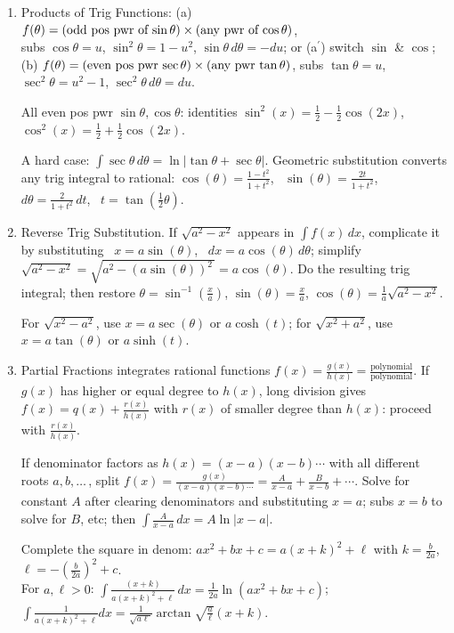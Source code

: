 \documentclass[10pt]{article}
\begin{document}
\begin{enumerate}
After identities, the right side may again contain $-\int f(x)\,dx$: 
solve for the integral.

\item Products of Trig Functions: (a) 
$f(\theta)= 
(\text{odd pos pwr of\,}\sin\theta)\times(\text{any pwr of\,}\cos\theta)$, \\
subs $\cos\theta=u$, $\sin^2\!\theta=1-u^2$, $\sin\theta\,d\theta=-du$; 
or (a$^\prime$) switch $\sin$ \& $\cos$; 
(b) $f(\theta)=(\text{even pos pwr\,}\sec\theta)\times(\text{any pwr\,}\tan\theta)$, 
subs $\tan\theta=u$, 
$\sec^2\!\theta=u^2-1$, $\sec^2\!\theta\,d\theta=du$.

All even pos pwr $\sin\theta, \cos\theta$:  identities 
$\sin^2(x)=\frac12-\frac12\cos(2x)$, 
$\cos^2(x)=\frac12+\frac12\cos(2x)$.

A hard case: $\int \sec\theta\,d\theta = \ln\!|\!\tan\theta{+}\sec\theta|$.
Geometric substitution converts any trig integral to 
rational: $\cos(\theta) = \frac{1-t^2}{1+t^2}$, \,
$\sin(\theta) =  \frac{2t}{1+t^2}$, \,
$d\theta = \frac{2}{1+t^2}\,dt$, \,
$t \!=\! \tan(\frac12\theta)$.

\item Reverse Trig Substitution. If $\sqrt{a^2{-}x^2}$ appears in $\int f(x)\,dx$, complicate it by substituting \ $x=a\sin(\theta)$, \ $dx = a\cos(\theta)\,d\theta$; simplify
$\sqrt{a^2{-}x^2}=\sqrt{a^2{-}(a\sin(\theta))^2\,} = a\cos(\theta)$.
Do the resulting trig integral; then restore $\theta = \sin^{-1}(\frac xa)$,
$\sin(\theta)=\frac xa$,
$\cos(\theta) = \frac1a\sqrt{a^2-x^2}$.

For $\sqrt{x^2{-}a^2}$, use $x=a\sec(\theta)$ or $a\cosh(t)$;
for $\sqrt{x^2{+}a^2}$, use $x=a\tan(\theta)$ or $a\sinh(t)$.

\item Partial Fractions integrates rational functions
$f(x) = \frac{g(x)}{h(x)}=\frac{\text{polynomial}}{\text{polynomial}}$.
If $g(x)$ has higher or equal degree to $h(x)$, 
long division gives $f(x) = q(x) + \frac{r(x)}{h(x)}$
with $r(x)$ of smaller degree than $h(x)$: proceed with $\frac{r(x)}{h(x)}$.

If denominator factors as $h(x) = (x{-}a)(x{-}b)\cdots$ with all
different roots $a,b,\ldots$\,, split 
$
f(x) = \frac{g(x)}{(x{-}a)(x{-}b)\cdots} = \frac{A}{x-a} + \frac{B}{x-b}+\cdots.
$
Solve for constant $A$ after clearing denominators 
and substituting $x=a$; 
subs $x=b$ to solve for $B$, etc; 
then $\int\!\! \frac{A}{x{-}a}\,dx=A\ln|x{-}a|$.

Complete the square in denom: 
$ax^2{+}bx{+}c=a(x{+}k)^2+\ell$ with   
$k=\frac{b}{2a}$, $\ell=-(\frac{b}{2a})^2+c$.\\
For $a,\ell>0$:  
$\int\! \frac{(x+k)}{a(x{+}k)^2+\ell}\, dx =\frac{1}{2a}\ln(ax^2{+}bx{+}c)$; \  
$\int\! \frac{1}{a(x{+}k)^2+\ell} dx 
=\frac{1}{\sqrt{\!a\ell}}\arctan\!\sqrt{\!\frac{a}{\ell}}(x{+}k)$.


\end{enumerate}
\end{document}
